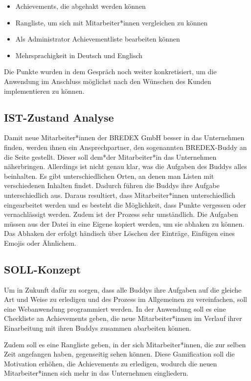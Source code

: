 \documentclass[12pt]{article}
\begin{document}
\begin{itemize} 
    \item Achievements, die abgehakt werden können
    \item Rangliste, um sich mit Mitarbeiter*innen vergleichen zu können
    \item Als Administrator Achievementliste bearbeiten können 
    \item Mehrsprachigkeit in Deutsch und Englisch
\end{itemize}

Die Punkte wurden in dem Gespräch noch weiter konkretisiert, um die Anwendung
im Anschluss möglichst nach den Wünschen des Kunden implementieren zu können.


\subsection{IST-Zustand Analyse}

Damit neue Mitarbeiter*innen der BREDEX GmbH besser in das Unternehmen
finden, werden ihnen ein Ansprechpartner, den sogenannten BREDEX-Buddy
an die Seite gestellt. Dieser soll dem*der Mitarbeiter*in das Unternehmen
näherbringen. Allerdings ist nicht genau klar, was die Aufgaben des Buddys
alles beinhalten. Es gibt unterschiedlichen Orten, an denen man Listen mit
verschiedenen Inhalten findet. 
Dadurch führen die Buddys ihre Aufgabe unterschiedlich aus. Daraus resultiert, 
dass Mitarbeiter*innen unterschiedlich eingearbeitet werden und es besteht die
Möglichkeit, dass Punkte vergessen oder vernachlässigt werden. \newline %
Zudem ist der Prozess sehr umständlich. Die Aufgaben müssen aus der Datei in eine Eigene kopiert werden,
um sie abhaken zu können. Das Abhaken der erfolgt händisch über Löschen der Einträge, Einfügen eines Emojis
oder Ähnlichem. 


\subsection{SOLL-Konzept}

Um in Zukunft dafür zu sorgen, dass alle Buddys ihre Aufgaben auf die gleiche Art
und Weise zu erledigen und des Prozess im Allgemeinen zu vereinfachen, soll eine Webanwendung programmiert werden. 
In der Anwendung soll es eine Checkliste an Achievements geben, die neue Mitarbeiter*innen im Verlauf ihrer Einarbeitung
mit ihren Buddys zusammen abarbeiten können.

Zudem soll es eine Rangliste geben, in der sich Mitarbeiter*innen, die zur selben Zeit angefangen haben, gegenseitig
sehen können. Diese Gamification soll die Motivation erhöhen, die Achievements zu erledigen, wodurch die neuen
Mitarbeiter*innen sich mehr in das Unternehmen eingliedern.
\end{document}
